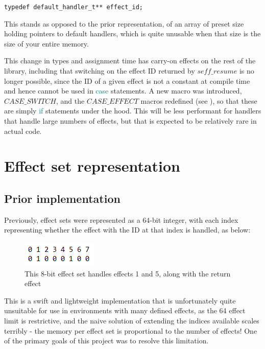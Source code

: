 \documentclass[logo,bsc,singlespacing,parskip,online]{infthesis}
\begin{document}
\lstinline{typedef default_handler_t** effect_id;}

This stands as opposed to the prior representation, of an array of preset size holding pointers to default handlers, which is quite unusable when that size is the size of your entire memory.


This change in types and assignment time has carry-on effects on the rest of the library, including that switching on the effect ID returned by $seff\_resume$ is no longer possible, since the ID of a given effect is not a constant at compile time and hence cannot be used in \textcolor{teal}{case} statements. A new macro was introduced, $CASE\_SWITCH$, and the $CASE\_EFFECT$ macros redefined (see ), so that these are simply \textcolor{teal}{if} statements under the hood. This will be less performant for handlers that handle large numbers of effects, but that is expected to be relatively rare in actual code.

\section{Effect set representation}

\subsection{Prior implementation}

Previously, effect sets were represented as a 64-bit integer, with each index representing whether the effect with the ID at that index is handled, as below:

\begin{figure}[ht]
    \centering
    \includegraphics[width=0.3\linewidth]{effect_set.png}
    \caption{This 8-bit effect set handles effects 1 and 5, along with the return effect}
\end{figure}

This is a swift and lightweight implementation that is unfortunately quite unsuitable for use in environments with many defined effects, as the 64 effect limit is restrictive, and the naive solution of extending the indices available scales terribly - the memory per effect set is proportional to the number of effects! One of the primary goals of this project was to resolve this limitation.
\end{document}
